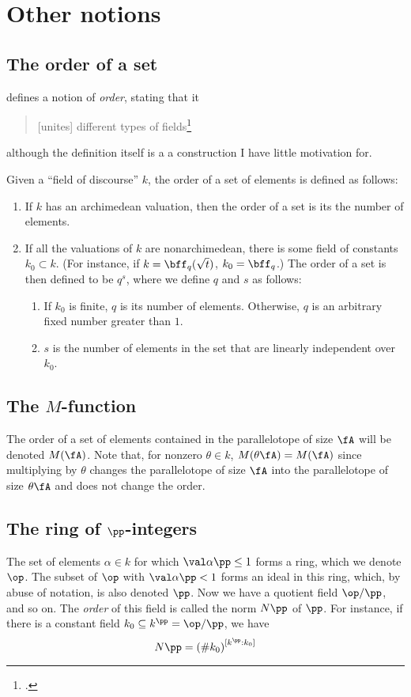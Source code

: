 \section{Other notions}
\subsection{The order of a set}
\label{sec:order}

\cite{artinwhaples} defines a notion of \textit{order},
stating that it
\begin{quotation}
[unites] different types of fields\footcite[p. 474]{artinwhaples}
\end{quotation}

although the definition itself is a a construction I have little motivation for.

Given a ``field of discourse'' $k$, the order of a set of elements is defined as follows:
\begin{enumerate}
\item If \(k\) has an archimedean valuation, then the order of a set is its the
  number of elements.
\item If all the valuations of $k$ are nonarchimedean, there is some field of constants \(k_0
\subset k\). (For instance, if $k = \bff_q(\sqrt t)$, $k_0 = \bff_q$.) The order of a set is then defined to be \(q^s\), where we define
\(q\) and \(s\) as follows:
  \begin{enumerate}
  \item If \(k_0\) is finite, \(q\) is its number of elements. Otherwise, \(q\) is an arbitrary fixed number greater than \(1\).
  \item \(s\) is the number of elements in the set that are linearly independent over \(k_0\).
  \end{enumerate}
\end{enumerate}

\subsection{The \(M\)-function}
\label{sec:orgheadline17}
The order of a set of elements contained in the parallelotope of size \(\fA\) will be denoted \(M(\fA)\).
Note that, for nonzero \(\theta\in k\), \(M(\theta\fA)=M(\fA)\) since multiplying by \(\theta\) changes the parallelotope of size \(\fA\) into the parallelotope of size \(\theta\fA\) and does not change the order.

\subsection{The ring of \(\pp\)-integers}
\label{sec:orgheadline18}
The set of elements \(\alpha\in k\) for which \(\val\alpha\pp \leq 1\) forms a ring, which we denote \(\op\).
The subset of \(\op\) with \(\val\alpha\pp < 1\) forms an ideal in this ring, which, by abuse of notation, is also denoted \(\pp\). Now we have a quotient field \(\op/\pp\), and so on. The \emph{order} of this field is called the norm \(N\pp\) of \(\pp\). For instance, if there is a constant field \(k_0
\subseteq k^{\pp} = \op/\pp\), we have
\[ N\pp = {(\# k_0)}^{[k^\pp : k_0]} \]

